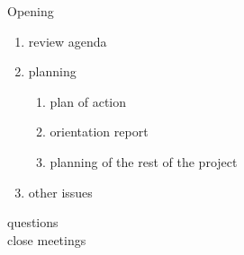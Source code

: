 \documentclass[pdftex, 12pt, a4paper]{report}
\begin{document}
\pagestyle{fancy}
\fancyhead[LE, LO] {\today}

Opening

\begin{enumerate}
\item review agenda			
\item planning
\begin{enumerate}
\item plan of action
\item orientation report
\item planning of the rest of the project
\end{enumerate}
\item other issues
\end{enumerate}

questions\\

close meetings
\end{document}
